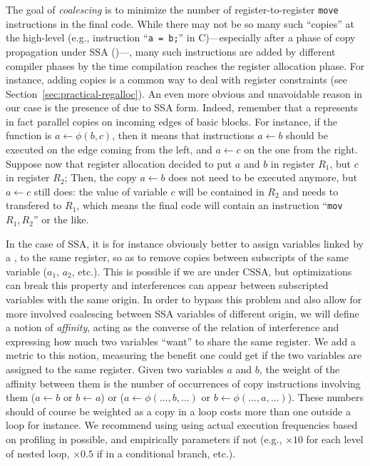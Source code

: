 {The goal of \emph{coalescing} is to minimize the number of register-to-register {\tt move} instructions in the final code.
While there may not be so many such ``copies'' at the high-level (e.g., instruction ``{\tt a = b;}'' in C)---especially after a phase of copy propagation under SSA ()---,
many such instructions are added by different compiler phases by the time compilation reaches the register allocation phase.
For instance, adding copies is a common way to deal with register constraints (see Section~\ref{sec:practical-regalloc}). 
An even more obvious and unavoidable reason in our case is the presence of \phifuns due to SSA form. 
Indeed, remember that a \phifun represents in fact parallel copies on incoming edges of basic blocks. 
For instance, if the function is $a \gets \phi(b,c)$, then it means that instructions $a\gets b$ should be executed on the edge coming from the left, and $a\gets c$ on the one from the right. 
Suppose now that register allocation decided to put $a$ and $b$ in register $R_1$, but $c$ in register $R_2$;
Then, the copy $a\gets b$ does not need to be executed anymore, but $a\gets c$ still does:
the value of variable $c$ will be contained in $R_2$ and needs to transfered to $R_1$, which means the final code will contain an instruction ``{\tt mov $R_1, R_2$}'' or the like. 



In the case of SSA, it is for instance obviously better to assign variables linked by a \phifun, to the same register, so as to remove copies between subscripts of the same variable ($a_1$, $a_2$, etc.).
This is possible if we are under CSSA, but optimizations can break this property and interferences can appear between subscripted variables with the same origin.
In order to bypass this problem and also allow for more involved coalescing between SSA variables of different origin, we will define a notion of \emph{affinity}, acting as the converse of the relation of interference and expressing how much two variables ``want'' to share the same register. 
We add a metric to this notion, measuring the benefit one could get if the two variables are assigned to the same register.
Given two variables $a$ and $b$, the weight of the affinity between them is the number of occurrences of copy instructions involving them ($a\gets b$ or $b\gets a$) or \phifuns ($a\gets\phi(\ldots,b,\ldots)$ or $b\gets\phi(\ldots,a,\ldots)$). 
These numbers should of course be weighted as a copy in a loop costs more than one outside a loop for instance.
We recommend using using actual execution frequencies based on profiling in possible, and empirically parameters if not
(e.g., $\times 10$ for each level of nested loop, $\times 0.5$ if in a conditional branch, etc.).


}
